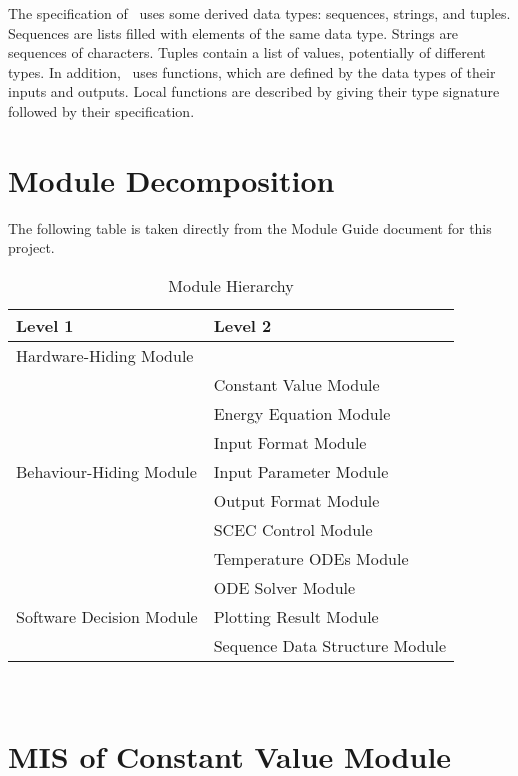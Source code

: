 \documentclass[12pt, titlepage]{article}
\begin{document}
\noindent
The specification of \progname \ uses some derived data types: sequences, strings, and
tuples. Sequences are lists filled with elements of the same data type. Strings
are sequences of characters. Tuples contain a list of values, potentially of
different types. In addition, \progname \ uses functions, which
are defined by the data types of their inputs and outputs. Local functions are
described by giving their type signature followed by their specification.

\section{Module Decomposition}

The following table is taken directly from the Module Guide document for this project.

\begin{table}[h!]
\centering
\begin{tabular}{p{} p{}}
\toprule
\textbf{Level 1} & \textbf{Level 2}\\
\midrule
{Hardware-Hiding Module} & ~ \\
\midrule

\multirow{7}{0.3\textwidth}{Behaviour-Hiding Module} 
& Constant Value Module\\ 
& Energy Equation Module\\
& Input Format Module\\
& Input Parameter Module\\
& Output Format Module\\
& SCEC Control Module\\
& Temperature ODEs Module\\
\midrule

\multirow{3}{0.3\textwidth}{Software Decision Module} 
& ODE Solver Module\\
& Plotting Result Module\\
& Sequence Data Structure Module\\
\bottomrule

\end{tabular}
\caption{Module Hierarchy}
\label{TblMH}
\end{table}


\newpage
~\newpage

\section{MIS of Constant Value Module} \label{Constant_Module} 
\end{document}
